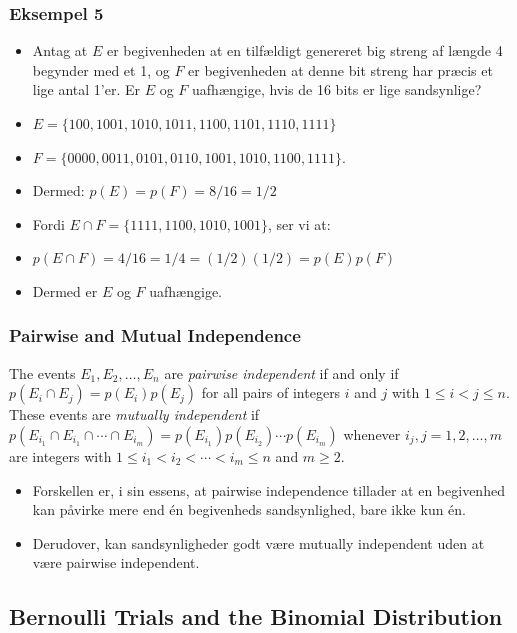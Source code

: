 \documentclass{beamer}
\begin{document}
\begin{frame}
  \frametitle{Eksempel 5}
  \begin{itemize}
  \item<1-> Antag at $E$ er begivenheden at en tilfældigt genereret big streng af længde 4 begynder med et 1, og $F$ er begivenheden at denne bit streng har præcis et lige antal 1'er. Er $E$ og $F$ uafhængige, hvis de 16 bits er lige sandsynlige?
  \item<2-> $E = \{100, 1001, 1010, 1011, 1100, 1101, 1110, 1111\}$
  \item<2-> $F = \{0000, 0011, 0101, 0110, 1001, 1010, 1100, 1111\}$.
  \item<3-> Dermed: $p(E) = p(F) = 8/16 = 1/2$
  \item<3-> Fordi $E \cap F = \{1111, 1100, 1010, 1001\}$, ser vi at:
  \item<3-> $p(E \cap F) = 4/16 = 1/4 = (1/2)(1/2) = p(E)p(F)$
  \item<3-> Dermed er $E$ og $F$ uafhængige.
  \end{itemize}
\end{frame}

\begin{frame}
  \frametitle{Pairwise and Mutual Independence}
  \begin{definition}[Definition 5]
The events $E_{1}, E_{2}, \ldots, E_{n}$ are \textit{pairwise independent} if and only if $p(E_{i} \cap E_{j})=p(E_{i})p(E_{j})$ for all pairs of integers $i$ and $j$ with $1 \leq i< j \leq n$. These events are \textit{mutually independent} if $p(E_{i_{1}} \cap E_{i_{1}} \cap \cdots \cap E_{i_{m}}) = p(E_{i_{1}})p(E_{i_{2}}) \cdots p(E_{i_{m}})$ whenever $i_{j}, j = 1, 2, \ldots, m$ are integers with $1 \leq i_{1} < i_{2} < \cdots < i_{m} \leq n$ and $m \geq 2$.
\end{definition}
\begin{itemize}
\item Forskellen er, i sin essens, at pairwise independence tillader at en begivenhed kan påvirke mere end én begivenheds sandsynlighed, bare ikke kun én.
\item Derudover, kan sandsynligheder godt være mutually independent uden at være pairwise independent.
\end{itemize}
\end{frame}

\subsection{Bernoulli Trials and the Binomial Distribution}
\label{subsec:bernoulli}
\end{document}
